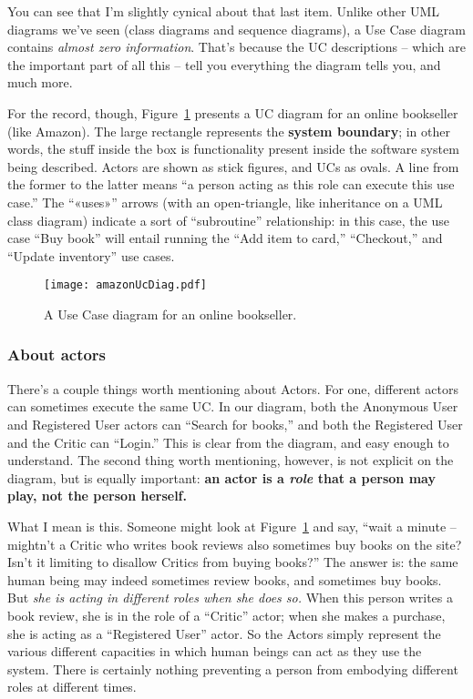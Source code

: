 You can see that I'm slightly cynical about that last item. Unlike other UML
diagrams we've seen (class diagrams and sequence diagrams), a Use Case diagram
contains \textit{almost zero information}. That's because the UC descriptions
-- which are the important part of all this -- tell you everything the diagram
tells you, and much more.

For the record, though, Figure~\ref{fig:amazonUcDiag} presents a UC diagram
for an online bookseller (like Amazon). The large rectangle represents the
\textbf{system boundary}; in other words, the stuff inside the box is
functionality present inside the software system being described. Actors are
shown as stick figures, and UCs as ovals. A line from the former to the latter
means ``a person acting as this role can execute this use case.'' The
``«uses»'' arrows (with an open-triangle, like inheritance on a UML class
diagram) indicate a sort of ``subroutine'' relationship: in this case, the use
case ``Buy book'' will entail running the ``Add item to card,'' ``Checkout,''
and ``Update inventory'' use cases.

\begin{figure}
\centering
\texttt{[image: amazonUcDiag.pdf]}
\caption{A Use Case diagram for an online bookseller.}
\label{fig:amazonUcDiag}
\end{figure}

\subsubsection{About actors}

There's a couple things worth mentioning about Actors. For one, different
actors can sometimes execute the same UC. In our diagram, both the Anonymous
User and Registered User actors can ``Search for books,'' and both the
Registered User and the Critic can ``Login.'' This is clear from the diagram,
and easy enough to understand. The second thing worth mentioning, however, is
not explicit on the diagram, but is equally important: \textbf{an actor is a
\textit{role} that a person may play, not the person herself.}

What I mean is this. Someone might look at Figure~\ref{fig:amazonUcDiag} and
say, ``wait a minute -- mightn't a Critic who writes book reviews also
sometimes buy books on the site? Isn't it limiting to disallow Critics from
buying books?'' The answer is: the same human being may indeed sometimes
review books, and sometimes buy books. But \textit{she is acting in different
roles when she does so.} When this person writes a book review, she is in the
role of a ``Critic'' actor; when she makes a purchase, she is acting as a
``Registered User'' actor. So the Actors simply represent the various
different capacities in which human beings can act as they use the system.
There is certainly nothing preventing a person from embodying different roles
at different times.

